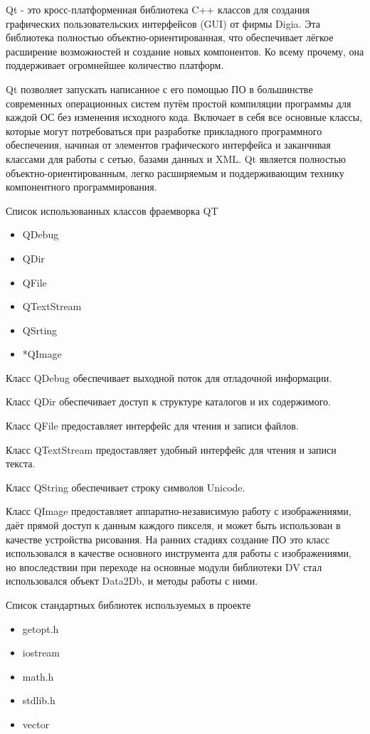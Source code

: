 Qt - это кросс-платформенная библиотека C++ классов для создания графических пользовательских интерфейсов (GUI) от фирмы Digia. Эта библиотека полностью объектно-ориентированная, что обеспечивает лёгкое расширение возможностей и создание новых компонентов. Ко всему прочему, она поддерживает огромнейшее количество платформ.

Qt позволяет запускать написанное с его помощью ПО в большинстве современных операционных систем путём простой компиляции программы для каждой ОС без изменения исходного кода. Включает в себя все основные классы, которые могут потребоваться при разработке прикладного программного обеспечения, начиная от элементов графического интерфейса и заканчивая классами для работы с сетью, базами данных и XML. Qt является полностью объектно-ориентированным, легко расширяемым и поддерживающим технику компонентного программирования.

Список использованных классов фраемворка QT
\begin{itemize}
\item QDebug
\item QDir
\item QFile
\item QTextStream
\item QSrting
\item *QImage
\end{itemize}

Класс QDebug обеспечивает выходной поток для отладочной информации.

Класс QDir обеспечивает доступ к структуре каталогов и их содержимого.

Класс QFile предоставляет интерфейс для чтения и записи файлов.

Класс QTextStream предоставляет удобный интерфейс для чтения и записи текста.

Класс QString обеспечивает строку символов Unicode.

Класс QImage предоставляет аппаратно-независимую работу с изображениями, даёт прямой доступ к данным каждого пикселя, и может быть использован в качестве устройства рисования. На ранних стадиях создание ПО это класс использовался в качестве основного инструмента для работы с изображениями, но впоследствии при переходе на основные модули библиотеки DV стал использовался объект Data2Db, и методы работы с ними.

Список стандартных библиотек используемых в проекте

\begin{itemize}
\item getopt.h
\item iostream
\item math.h
\item stdlib.h
\item vector
\end{itemize}

